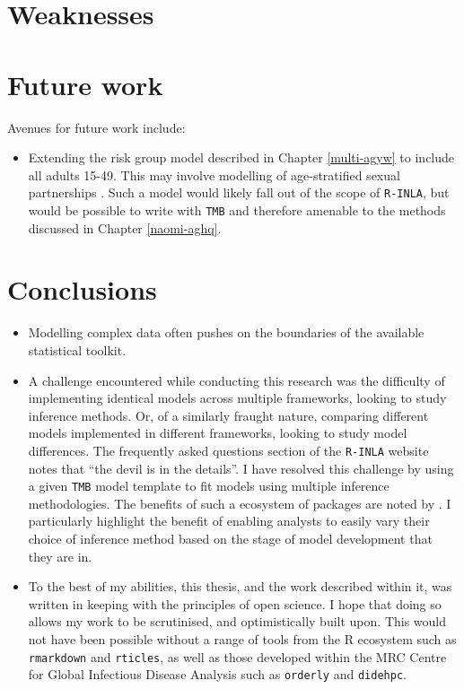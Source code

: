 \documentclass[a4paper, nobind]{templates/ociamthesis}
\providecommand{\tightlist}{%
  \setlength{\itemsep}{0pt}\setlength{\parskip}{0pt}}
\begin{document}
\hypertarget{weaknesses}{%
\section{Weaknesses}\label{weaknesses}}

\hypertarget{future-work}{%
\section{Future work}\label{future-work}}

Avenues for future work include:

\begin{itemize}
\tightlist
\item
  Extending the risk group model described in Chapter \ref{multi-agyw} to include all adults 15-49. This may involve modelling of age-stratified sexual partnerships \autocite{wolock2021evaluating}.
  Such a model would likely fall out of the scope of \texttt{R-INLA}, but would be possible to write with \texttt{TMB} and therefore amenable to the methods discussed in Chapter \ref{naomi-aghq}.
\end{itemize}

\hypertarget{conclusions-1}{%
\section{Conclusions}\label{conclusions-1}}

\begin{itemize}
\item
  Modelling complex data often pushes on the boundaries of the available statistical toolkit.
\item
  A challenge encountered while conducting this research was the difficulty of implementing identical models across multiple frameworks, looking to study inference methods. Or, of a similarly fraught nature, comparing different models implemented in different frameworks, looking to study model differences. The frequently asked questions section of the \texttt{R-INLA} website \autocite{rinla2023faq} notes that ``the devil is in the details''. I have resolved this challenge by using a given \texttt{TMB} model template to fit models using multiple inference methodologies. The benefits of such a ecosystem of packages are noted by \textcite{stringer2021fields}. I particularly highlight the benefit of enabling analysts to easily vary their choice of inference method based on the stage of model development that they are in.
\item
  To the best of my abilities, this thesis, and the work described within it, was written in keeping with the principles of open science.
  I hope that doing so allows my work to be scrutinised, and optimistically built upon.
  This would not have been possible without a range of tools from the R ecosystem such as \texttt{rmarkdown} and \texttt{rticles}, as well as those developed within the MRC Centre for Global Infectious Disease Analysis such as \texttt{orderly} and \texttt{didehpc}.
\end{itemize}
\end{document}
